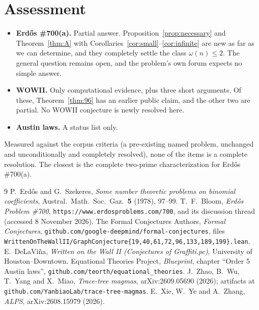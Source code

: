 \documentclass[11pt,a4paper]{article}
\theoremstyle{definition}
\begin{document}
\section{Assessment}\label{sec:assessment}
\begin{itemize}
\item \textbf{Erd\H{o}s \#700(a).} Partial answer. Proposition~\ref{prop:necessary} and
  Theorem~\ref{thm:A} with Corollaries~\ref{cor:small}--\ref{cor:infinite} are new as far as
  we can determine, and they completely settle the class $\omega(n)\le2$. The general
  question remains open, and the problem's own forum expects no simple answer.
\item \textbf{WOWII.} Only computational evidence, plus three short arguments. Of these,
  Theorem~\ref{thm:96} has an earlier public claim, and the other two are partial. No
  WOWII conjecture is newly resolved here.
\item \textbf{Austin laws.} A status list only.
\end{itemize}
Measured against the corpus criteria (a pre-existing named problem, unchanged and
unconditionally and completely resolved), none of the items is a complete resolution. The
closest is the complete two-prime characterization for Erd\H{o}s \#700(a).

\begin{thebibliography}{9}
 P.~Erd\H{o}s and G.~Szekeres, \emph{Some number theoretic problems on
  binomial coefficients}, Austral.\ Math.\ Soc.\ Gaz.\ \textbf{5} (1978), 97--99.
 T.~F.~Bloom, \emph{Erd\H{o}s Problem \#700},
  \texttt{https://www.erdosproblems.com/700}, and its discussion thread (accessed
  8 November 2026).
 The Formal Conjectures Authors, \emph{Formal Conjectures},
  \texttt{github.com/google-deepmind/formal-conjectures}, files
  \texttt{WrittenOnTheWallII/GraphConjecture\{19,40,61,72,96,133,189,199\}.lean}.
 E.~DeLaVi\~na, \emph{Written on the Wall II (Conjectures of
  Graffiti.pc)}, University of Houston--Downtown.
 Equational Theories Project, \emph{Blueprint}, chapter ``Order 5
  Austin laws'', \texttt{github.com/teorth/equational\_theories}.
 J.~Zhao, B.~Wu, T.~Yang and X.~Miao, \emph{Trace-tree magmas},
  arXiv:2609.05690 (2026); artifacts at \texttt{github.com/YanbiaoLab/trace-tree-magmas}.
 E.~Xie, W.~Ye and A.~Zhang, \emph{ALPS}, arXiv:2608.15979 (2026).
\end{thebibliography}
\end{document}
